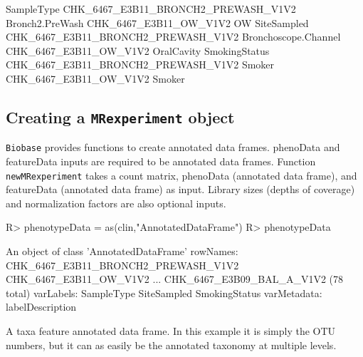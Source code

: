 \documentclass[a4paper,12pt]{article}
\begin{document}
\begin{small}
\begin{Schunk}
\begin{Soutput}
                                         SampleType
CHK_6467_E3B11_BRONCH2_PREWASH_V1V2 Bronch2.PreWash
CHK_6467_E3B11_OW_V1V2                           OW
                                             SiteSampled
CHK_6467_E3B11_BRONCH2_PREWASH_V1V2 Bronchoscope.Channel
CHK_6467_E3B11_OW_V1V2                        OralCavity
                                    SmokingStatus
CHK_6467_E3B11_BRONCH2_PREWASH_V1V2        Smoker
CHK_6467_E3B11_OW_V1V2                     Smoker
\end{Soutput}
\end{Schunk}
\end{small}

\subsection{Creating a \texttt{MRexperiment} object}

\texttt{Biobase} provides functions to create annotated data frames. 
phenoData and featureData inputs are required to be annotated data frames. 
Function \texttt{newMRexperiment} takes a count matrix, phenoData (annotated data frame), and featureData (annotated data frame) as input. 
Library sizes (depths of coverage) and normalization factors are also optional inputs.

\begin{small}
\begin{Schunk}
\begin{Sinput}
R> phenotypeData = as(clin,"AnnotatedDataFrame")
R> phenotypeData
\end{Sinput}
\begin{Soutput}
An object of class 'AnnotatedDataFrame'
  rowNames:
    CHK_6467_E3B11_BRONCH2_PREWASH_V1V2
    CHK_6467_E3B11_OW_V1V2 ...
    CHK_6467_E3B09_BAL_A_V1V2 (78 total)
  varLabels: SampleType SiteSampled
    SmokingStatus
  varMetadata: labelDescription
\end{Soutput}
\end{Schunk}
\end{small}

A taxa feature annotated data frame. In this example it is simply the OTU numbers, but it can as easily be the annotated taxonomy at multiple levels.
\end{document}
